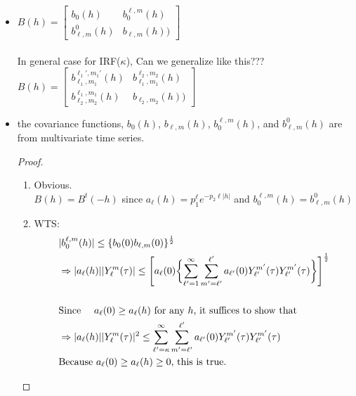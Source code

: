 \documentclass[11pt]{article}
\begin{document}
\begin{itemize}
\item
$B(h)= 
\begin{bmatrix}
b_0(h) & b_0^{\ell,m}(h) \\ 
b_{\ell,m}^0(h) & b_{\ell,m}(h)) 
\end{bmatrix}$
\\\\
In general case for IRF($\kappa$), {\color{red} Can we generalize like this???}\\
$B(h)= 
\begin{bmatrix}
b_{\ell_1,m_1}^{\ell_1',m_1'}(h) & b_{\ell_1,m_1}^{\ell_2,m_2}(h) \\ 
b_{\ell_2,m_2}^{\ell_1,m_1}(h) & b_{\ell_2,m_2}(h)) 
\end{bmatrix}$

\item
the covariance functions, $b_0(h)$, $b_{\ell, m}(h)$, $b_0^{\ell,m}(h)$, and $b_{\ell,m}^0(h)$ are from multivariate time series.\\

\begin{proof}
\begin{enumerate}
\item
Obvious.\\
$B(h)=B^t(-h)$ since $a_\ell(h)=p_1^\ell e^{-p_2 \ell |h|}$ and $b_{0}^{\ell,m}(h) = b_{\ell,m}^{0}(h)$\\

\item
WTS:\\
\begin{align*}
&|b_{0}^{\ell,m}(h)| \le \{b_{0}(0) b_{\ell,m}(0)\}^\frac{1}{2}\\
&\Rightarrow |a_{\ell}(h)||Y_{\ell}^{m}(\tau)| \le \Biggl[ a_{\ell}(0) \biggl\{ \sum_{{\ell}'=1}^{\infty} \sum_{m'=\ell'}^{\ell'} a_{{\ell}'}(0) Y_{{\ell}'}^{{m}'}(\tau) Y_{{\ell}'}^{{m}'}(\tau) \biggl\} \Biggl]^\frac{1}{2}\\
\\
&\text{Since \quad $a_{\ell}(0) \ge a_{\ell}(h)$ for any $h$, it suffices to show that }\\
&\Rightarrow |a_{\ell}(h)||Y_{\ell}^{m}(\tau)|^2 \le \sum_{{\ell}'=\kappa}^{\infty} \sum_{m'=\ell'}^{\ell'} a_{{\ell}'}(0) Y_{{\ell}'}^{{m}'}(\tau) Y_{{\ell}'}^{{m}'}(\tau)\\
&\text{Because $a_\ell(0) \ge a_\ell(h)  \ge 0$, this is true.}\\
\end{align*}


\end{enumerate}
\end{proof}
\end{itemize}
\end{document}
